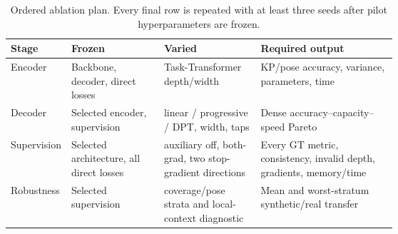 \begin{table}[t]
  \centering
  \caption{Ordered ablation plan.  Every final row is repeated with at least
  three seeds after pilot hyperparameters are frozen.}
  \label{tab:ablation_protocol}
  \small
  \begin{tabularx}{\linewidth}{@{}p{0.14\linewidth}p{0.24\linewidth}p{0.25\linewidth}X@{}}
    \toprule
    Stage & Frozen & Varied & Required output \\
    \midrule
    Encoder & Backbone, decoder, direct losses & Task-Transformer depth/width &
      KP/pose accuracy, variance, parameters, time \\
    Decoder & Selected encoder, supervision & linear / progressive / DPT,
      width, taps & Dense accuracy--capacity--speed Pareto \\
    Supervision & Selected architecture, all direct losses & auxiliary off,
      both-grad, two stop-gradient directions & Every GT metric, consistency,
      invalid depth, gradients, memory/time \\
    Robustness & Selected supervision & coverage/pose strata and local-context
      diagnostic & Mean and worst-stratum synthetic/real transfer \\
    \bottomrule
  \end{tabularx}
\end{table}

